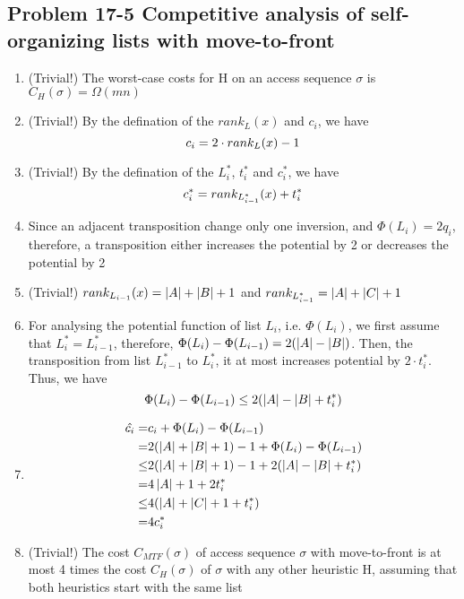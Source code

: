 \subsection*{Problem 17-5 Competitive analysis of self-organizing lists with move-to-front}
\begin{enumerate}
	\item	(Trivial!) The worst-case costs for H on an access sequence $\sigma$ is $C_H(\sigma) = \Omega(mn)$
	\item	(Trivial!) By the defination of the $rank_L(x)$ and $c_i$, we have
		\begin{equation} \notag
			c_i = 2 \cdot rank_L(x) - 1
		\end{equation}
	\item	(Trivial!) By the defination of the $L^{*}_{i}$, $t^{*}_{i}$ and $c^{*}_{i}$, we have
		\begin{equation} \notag
			c^{*}_{i} = rank_{L^{*}_{i - 1}}(x) + t^{*}_{i}
		\end{equation}
	\item	Since an adjacent transposition change only one inversion, and $\Phi(L_i) = 2q_i$, therefore, a transposition either increases the potential by 2 or decreases the potential by 2
	\item	(Trivial!) $rank_{L_{i - 1}}(x) = \left\lvert A \right\rvert + \left\lvert B \right\rvert + 1$ and $rank_{L^{*}_{i - 1}} = \left\lvert A \right\rvert + \left\lvert C \right\rvert + 1$
	\item	For analysing the potential function of list $L_i$, i.e. $\Phi(L_i)$, we first assume that $L^{*}_{i} = L^{*}_{i - 1}$, therefore, $\Phi(L_i) - \Phi(L_{i - 1}) = 2(\left\lvert A \right\rvert - \left\lvert B \right\rvert)$. Then, the transposition from list $L^{*}_{i - 1}$ to $L^{*}_{i}$, it at most increases potential by $2 \cdot t^{*}_{i}$. \\
		Thus, we have
		\begin{equation} \notag
			\Phi(L_i) - \Phi(L_{i - 1}) \leq 2(\left\lvert A \right\rvert - \left\lvert B \right\rvert + t^{*}_{i})
		\end{equation}
	\item	\begin{equation} \notag
		\begin{aligned}
			\hat{c_i}	=& c_i + \Phi(L_i) - \Phi(L_{i - 1}) \\
					=& 2 (\left\lvert A \right\rvert + \left\lvert B \right\rvert + 1) - 1 + \Phi(L_i) - \Phi(L_{i - 1}) \\
					\leq& 2 (\left\lvert A \right\rvert + \left\lvert B \right\rvert + 1) - 1 + 2 (\left\lvert A \right\rvert - \left\lvert B \right\rvert + t^{*}_i) \\
					=& 4 \left\lvert A \right\rvert + 1 + 2 t^{*}_i \\
					\leq& 4 (\left\lvert A \right\rvert + \left\lvert C \right\rvert + 1 + t^{*}_i) \\
					=& 4 c^{*}_i
		\end{aligned}
		\end{equation}
	\item	(Trivial!) The cost $C_{MTF}(\sigma)$ of access sequence $\sigma$ with move-to-front is at most 4 times the cost $C_H(\sigma)$ of $\sigma$ with any other heuristic H, assuming that both heuristics start with the same list
\end{enumerate}


